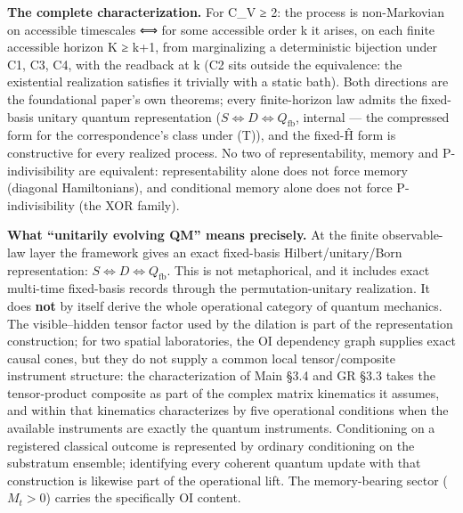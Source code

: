 \documentclass[
]{article}
\begin{document}
\textbf{The complete characterization.} For \textbar C\_V\textbar{} ≥ 2:
the process is non-Markovian on accessible timescales ⟺ for some
accessible order k it arises, on each finite accessible horizon K ≥ k+1,
from marginalizing a deterministic bijection under C1, C3, C4, with the
readback at k (C2 sits outside the equivalence: the existential
realization satisfies it trivially with a static bath). Both directions
are the foundational paper's own theorems; every finite-horizon law
admits the fixed-basis unitary quantum representation
(\(S \iff D \iff Q_{\mathrm{fb}}\), internal --- the compressed form for
the correspondence's class under (T)), and the fixed-Ĥ form is
constructive for every realized process. No two of representability,
memory and P-indivisibility are equivalent: representability alone does
not force memory (diagonal Hamiltonians), and conditional memory alone
does not force P-indivisibility (the XOR family).

\textbf{What ``unitarily evolving QM'' means precisely.} At the finite
observable-law layer the framework gives an exact fixed-basis
Hilbert/unitary/Born representation: \(S \iff D \iff Q_{\mathrm{fb}}\).
This is not metaphorical, and it includes exact multi-time fixed-basis
records through the permutation-unitary realization. It does
\textbf{not} by itself derive the whole operational category of quantum
mechanics. The visible--hidden tensor factor used by the dilation is
part of the representation construction; for two spatial laboratories,
the OI dependency graph supplies exact causal cones, but they do not
supply a common local tensor/composite instrument structure: the
characterization of Main §3.4 and GR §3.3 takes the tensor-product
composite as part of the complex matrix kinematics it assumes, and
within that kinematics characterizes by five operational conditions when
the available instruments are exactly the quantum instruments.
Conditioning on a registered classical outcome is represented by
ordinary conditioning on the substratum ensemble; identifying every
coherent quantum update with that construction is likewise part of the
operational lift. The memory-bearing sector (\(M_t>0\)) carries the
specifically OI content.
\end{document}
